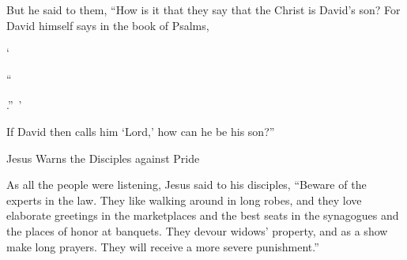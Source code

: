 {\par }{\PP {}But
he said
to
them,
“How
is it that they say
that the Christ
is
David’s
son?
For
David
himself
says
in
the book
of Psalms,
\par }{\Q ‘{}
{}
\par }{\Q “{}
\par }{\Q {}.” ’
\par }{\PI {}If David
then
calls
him
‘Lord,’
how
can he be
his
son?”
\par }{\SH Jesus Warns the Disciples against Pride
\par }{\PP {}As all
the people
were listening,
Jesus said
to his disciples,
“Beware
of
the experts in the law.
They like walking around
in
long robes,
and
they love
elaborate greetings
in
the marketplaces
and
the best seats
in
the synagogues
and
the places of honor
at
banquets.
They devour
widows’
property,
and
as a show
make
long
prayers.
They will receive
a more severe
punishment.”

}

